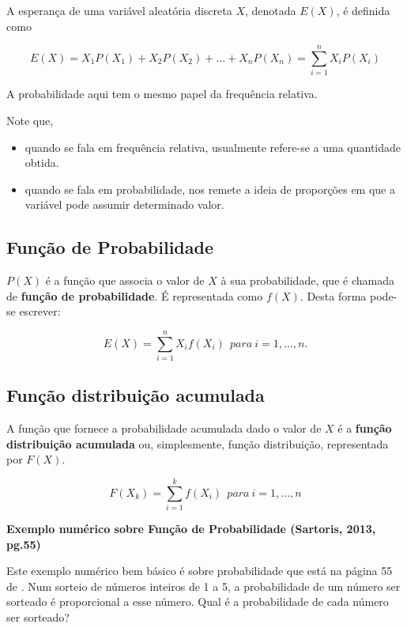 \documentclass[
]{book}
\providecommand{\tightlist}{%
  \setlength{\itemsep}{0pt}\setlength{\parskip}{0pt}}
\begin{document}
A esperança de uma variável aleatória discreta \(X\), denotada \(E(X)\), é definida como

\[
  E(X) = X_1P(X_1) + X_2P(X_2) + \ldots + X_nP(X_n) = \sum_{i=1}^{n}X_iP(X_i)
\]

A probabilidade aqui tem o mesmo papel da frequência relativa.

Note que,

\begin{itemize}
\tightlist
\item
  quando se fala em frequência relativa, usualmente refere-se a
  uma quantidade obtida.
\item
  quando se fala em probabilidade, nos remete a ideia de proporções em que
  a variável pode assumir determinado valor.
\end{itemize}

\hypertarget{funuxe7uxe3o-de-probabilidade}{%
\subsection{Função de Probabilidade}\label{funuxe7uxe3o-de-probabilidade}}

\(P(X)\) é a função que associa o valor de \(X\) à sua probabilidade, que é chamada
de \textbf{função de probabilidade}. É representada como \(f(X)\).
Desta forma pode-se escrever:

\[
E(X) = \sum_ {i=1}^{n}X_i f(X_i)~~para~i=1,\ldots,n.
\]

\hypertarget{funuxe7uxe3o-distribuiuxe7uxe3o-acumulada}{%
\subsection{Função distribuição acumulada}\label{funuxe7uxe3o-distribuiuxe7uxe3o-acumulada}}

A função que fornece a probabilidade acumulada dado o valor de \(X\) é a
\textbf{função distribuição acumulada} ou, simplesmente, função distribuição,
representada por \(F(X)\).

\[
F(X_k) = \sum_{i=1}^{k} f(X_i)~~para~i=1, \ldots,n
\]

\textbf{Exemplo numérico sobre Função de Probabilidade (Sartoris, 2013, pg.55)}

Este exemplo numérico bem básico é sobre probabilidade que está na página 55 de
\citet{Sartoris2013}.
Num sorteio de números inteiros de 1 a 5, a probabilidade de um número ser sorteado é proporcional a esse número. Qual é a probabilidade de cada número ser sorteado?
\end{document}
